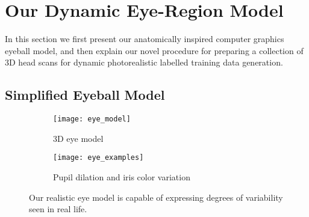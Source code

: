 
\section{Our Dynamic Eye-Region Model}




In this section we first present our anatomically inspired computer graphics eyeball model, and then explain our novel procedure for preparing a collection of 3D head scans for dynamic photorealistic labelled training data generation.

\subsection{Simplified Eyeball Model}
\label{subsec:eyeball_model}

\begin{figure}
    \centering
    \begin{subfigure}[t]{0.33\columnwidth}
        \texttt{[image: eye\_model]}
        \caption{3D eye model}
        \label{fig:3d_eye_model}
    \end{subfigure}%
    \hfill
    \begin{subfigure}[t]{0.65\columnwidth}
        \texttt{[image: eye\_examples]}
        \caption{Pupil dilation and iris color variation}
    \end{subfigure}
    \caption{Our realistic eye model is capable of expressing degrees of variability seen in real life.}
    \label{fig:eye_model}
\end{figure}


